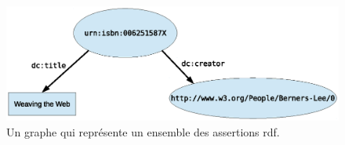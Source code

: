 \begin{figure}[h]
    \centering
    \includegraphics[width=1\textwidth]{figs/A/rdf-graph.eps}
    \caption{Un graphe qui représente un ensemble des assertions
      \acrshort{rdf}.}\label{fig:rdf-graph}
\end{figure}
